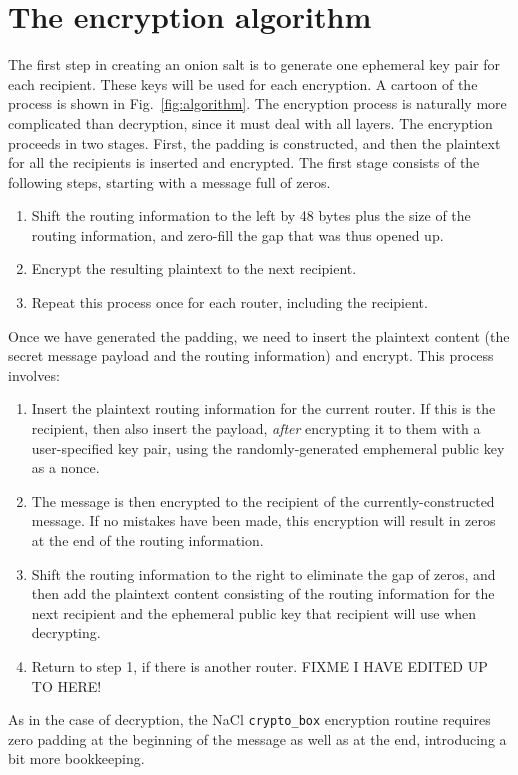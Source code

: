 \documentclass[letterpaper,twocolumn,amsmath,amssymb,pre,aps,10pt]{revtex4-1}
\begin{document}
\section{The encryption algorithm}

The first step in creating an onion salt is to generate one ephemeral
key pair for each recipient.  These keys will be used for each
encryption.  A cartoon of the process is shown in
Fig.~\ref{fig:algorithm}.  The encryption process is naturally more
complicated than decryption, since it must deal with all layers.  The
encryption proceeds in two stages.  First, the padding is constructed,
and then the plaintext for all the recipients is inserted and
encrypted.  The first stage consists of the following steps, starting
with a message full of zeros.
\begin{enumerate}
\item Shift the routing information to the left by 48 bytes plus the
  size of the routing information, and zero-fill the gap that was thus
  opened up.
\item Encrypt the resulting plaintext to the next recipient.
\item Repeat this process once for each router, including the
  recipient.
\end{enumerate}
Once we have generated the padding, we need to insert the plaintext
content (the secret message payload and the routing information) and
encrypt.  This process involves:
\begin{enumerate}
\item Insert the plaintext routing information for the current router.
  If this is the recipient, then also insert the payload, \emph{after}
  encrypting it to them with a user-specified key pair, using the
  randomly-generated emphemeral public key as a nonce.
\item The message is then encrypted to the recipient of the
  currently-constructed message.  If no mistakes have been made, this
  encryption will result in zeros at the end of the routing
  information.
\item Shift the routing information to the right to eliminate the gap
  of zeros, and then add the plaintext content consisting of the
  routing information for the next recipient and the ephemeral public
  key that recipient will use when decrypting.
\item Return to step 1, if there is another router.  FIXME I HAVE
  EDITED UP TO HERE!
\end{enumerate}
As in the case of decryption, the NaCl \texttt{crypto\_box} encryption
routine requires zero padding at the beginning of the message as well
as at the end, introducing a bit more bookkeeping.
\end{document}
